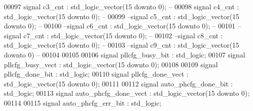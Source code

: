 \begin{DoxyCode}
00097 \textcolor{keywordflow}{signal} \textcolor{vhdlchar}{c3_cnt}           \textcolor{vhdlchar}{:}  \textcolor{comment}{std\_logic\_vector}\textcolor{vhdlchar}{(}\textcolor{vhdllogic}{}\textcolor{vhdllogic}{15} \textcolor{keywordflow}{downto} \textcolor{vhdllogic}{}\textcolor{vhdllogic}{0}\textcolor{vhdlchar}{)};\textcolor{keyword}{ -- }
00098 \textcolor{keywordflow}{signal} \textcolor{vhdlchar}{c4_cnt}           \textcolor{vhdlchar}{:}  \textcolor{comment}{std\_logic\_vector}\textcolor{vhdlchar}{(}\textcolor{vhdllogic}{}\textcolor{vhdllogic}{15} \textcolor{keywordflow}{downto} \textcolor{vhdllogic}{}\textcolor{vhdllogic}{0}\textcolor{vhdlchar}{)};\textcolor{keyword}{ -- }
00099 \textcolor{keyword}{--signal c5\_cnt         :  std\_logic\_vector(15 downto 0); -- }
00100 \textcolor{keyword}{--signal c6\_cnt         :  std\_logic\_vector(15 downto 0); -- }
00101 \textcolor{keyword}{--signal c7\_cnt         :  std\_logic\_vector(15 downto 0); -- }
00102 \textcolor{keyword}{--signal c8\_cnt         :  std\_logic\_vector(15 downto 0); -- }
00103 \textcolor{keyword}{--signal c9\_cnt         :  std\_logic\_vector(15 downto 0) -- }
00104 
00105 
00106 \textcolor{keywordflow}{signal} \textcolor{vhdlchar}{pllcfg_busy_bit}  \textcolor{vhdlchar}{:} \textcolor{comment}{std\_logic};
00107 \textcolor{keywordflow}{signal} \textcolor{vhdlchar}{pllcfg_busy_vect} \textcolor{vhdlchar}{:} \textcolor{comment}{std\_logic\_vector}\textcolor{vhdlchar}{(}\textcolor{vhdllogic}{}\textcolor{vhdllogic}{15} \textcolor{keywordflow}{downto} \textcolor{vhdllogic}{}\textcolor{vhdllogic}{0}\textcolor{vhdlchar}{)};
00108 
00109 \textcolor{keywordflow}{signal} \textcolor{vhdlchar}{pllcfg_done_bit}  \textcolor{vhdlchar}{:} \textcolor{comment}{std\_logic};
00110 \textcolor{keywordflow}{signal} \textcolor{vhdlchar}{pllcfg_done_vect} \textcolor{vhdlchar}{:} \textcolor{comment}{std\_logic\_vector}\textcolor{vhdlchar}{(}\textcolor{vhdllogic}{}\textcolor{vhdllogic}{15} \textcolor{keywordflow}{downto} \textcolor{vhdllogic}{}\textcolor{vhdllogic}{0}\textcolor{vhdlchar}{)};
00111 
00112 \textcolor{keywordflow}{signal} \textcolor{vhdlchar}{auto_phcfg_done_bit}     \textcolor{vhdlchar}{:} \textcolor{comment}{std\_logic};
00113 \textcolor{keywordflow}{signal} \textcolor{vhdlchar}{auto_phcfg_done_vect} \textcolor{vhdlchar}{:} \textcolor{comment}{std\_logic\_vector}\textcolor{vhdlchar}{(}\textcolor{vhdllogic}{}\textcolor{vhdllogic}{15} \textcolor{keywordflow}{downto} \textcolor{vhdllogic}{}\textcolor{vhdllogic}{0}\textcolor{vhdlchar}{)};
00114 
00115 \textcolor{keywordflow}{signal} \textcolor{vhdlchar}{auto_phcfg_err_bit}      \textcolor{vhdlchar}{:} \textcolor{comment}{std\_logic};

\end{DoxyCode}
